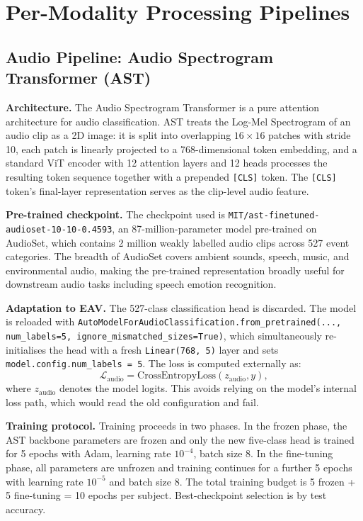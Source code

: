 \section{Per-Modality Processing Pipelines}
\subsection{Audio Pipeline: Audio Spectrogram Transformer (AST)}
\textbf{Architecture.} The Audio Spectrogram Transformer \cite{Gong2021AST} is a pure attention architecture for audio classification. AST treats the Log-Mel Spectrogram of an audio clip as a 2D image: it is split into overlapping $16\times16$ patches with stride 10, each patch is linearly projected to a 768-dimensional token embedding, and a standard ViT encoder with 12 attention layers and 12 heads processes the resulting token sequence together with a prepended \texttt{[CLS]} token. The \texttt{[CLS]} token's final-layer representation serves as the clip-level audio feature.

\textbf{Pre-trained checkpoint.} The checkpoint used is \texttt{MIT/ast-finetuned-audioset-10-10-0.4593}, an 87-million-parameter model pre-trained on AudioSet, which contains 2 million weakly labelled audio clips across 527 event categories. The breadth of AudioSet covers ambient sounds, speech, music, and environmental audio, making the pre-trained representation broadly useful for downstream audio tasks including speech emotion recognition.

\textbf{Adaptation to EAV.} The 527-class classification head is discarded. The model is reloaded with \texttt{AutoModelForAudioClassification.from\_pretrained(..., num\_labels=5, ignore\_mismatched\_sizes=True)}, which simultaneously re-initialises the head with a fresh \texttt{Linear(768, 5)} layer and sets \texttt{model.config.num\_labels = 5}. The loss is computed externally as:
\begin{equation}
    \mathcal{L}_{\mathrm{audio}} = \mathrm{CrossEntropyLoss}(z_{\mathrm{audio}}, y),
\end{equation}
where $z_{\mathrm{audio}}$ denotes the model logits. This avoids relying on the model's internal loss path, which would read the old configuration and fail.

\textbf{Training protocol.} Training proceeds in two phases. In the frozen phase, the AST backbone parameters are frozen and only the new five-class head is trained for 5 epochs with Adam, learning rate $10^{-4}$, batch size 8. In the fine-tuning phase, all parameters are unfrozen and training continues for a further 5 epochs with learning rate $10^{-5}$ and batch size 8. The total training budget is 5 frozen + 5 fine-tuning = 10 epochs per subject. Best-checkpoint selection is by test accuracy.

